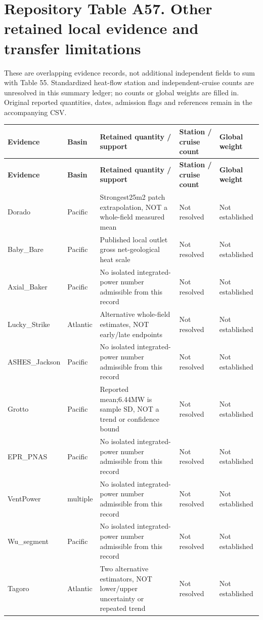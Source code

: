 \documentclass[11pt,a4paper]{article}
\begin{document}
\section*{Repository Table A57. Other retained local evidence and transfer limitations}
These are overlapping evidence records, not additional independent fields to sum with Table 55. Standardized heat-flow station and independent-cruise counts are unresolved in this summary ledger; no counts or global weights are filled in. Original reported quantities, dates, admission flags and references remain in the accompanying CSV.\par
{\fontsize{8.3}{10.1}\selectfont\begin{longtable}{>{\raggedright\arraybackslash}p{31.883mm}>{\raggedright\arraybackslash}p{31.883mm}>{\raggedright\arraybackslash}p{31.883mm}>{\raggedright\arraybackslash}p{31.883mm}>{\raggedright\arraybackslash}p{31.883mm}}\toprule
\textbf{Evidence} & \textbf{Basin} & \textbf{Retained quantity /\allowbreak{} support} & \textbf{Station /\allowbreak{} cruise count} & \textbf{Global weight}\\\midrule\endfirsthead
\textbf{Evidence} & \textbf{Basin} & \textbf{Retained quantity /\allowbreak{} support} & \textbf{Station /\allowbreak{} cruise count} & \textbf{Global weight}\\\midrule\endhead
\bottomrule\endfoot
Dorado & Pacific & Strongest25m2 patch extrapolation, NOT a whole-field measured mean & Not resolved & Not established\\
Baby\_\allowbreak{}Bare & Pacific & Published local outlet gross net-geological heat scale & Not resolved & Not established\\
Axial\_\allowbreak{}Baker & Pacific & No isolated integrated-power number admissible from this record & Not resolved & Not established\\
Lucky\_\allowbreak{}Strike & Atlantic & Alternative whole-field estimates, NOT early/\allowbreak{}late endpoints & Not resolved & Not established\\
ASHES\_\allowbreak{}Jackson & Pacific & No isolated integrated-power number admissible from this record & Not resolved & Not established\\
Grotto & Pacific & Reported mean;6.44MW is sample SD, NOT a trend or confidence bound & Not resolved & Not established\\
EPR\_\allowbreak{}PNAS & Pacific & No isolated integrated-power number admissible from this record & Not resolved & Not established\\
VentPower & multiple & No isolated integrated-power number admissible from this record & Not resolved & Not established\\
Wu\_\allowbreak{}segment & Pacific & No isolated integrated-power number admissible from this record & Not resolved & Not established\\
Tagoro & Atlantic & Two alternative estimators, NOT lower/\allowbreak{}upper uncertainty or repeated trend & Not resolved & Not established\\
\end{longtable}}
\clearpage
\end{document}
